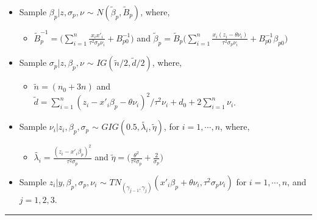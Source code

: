 \begin{itemize}
\tightlist
\item
  Sample \(\beta_{p}| z, \sigma_{p}, \nu\) \(\sim\) \(N(\tilde{\beta}_{p}, \tilde{B}_{p})\), where,

  \begin{itemize}
  \tightlist
  \item
    \(\tilde{B}^{-1}_{p} = \bigg(\sum_{i=1}^{n} \frac{x_{i}x'_{i}}{\tau^{2} \sigma_{p} \nu_{i}} + B_{p0}^{-1} \bigg)\) \hspace{0.05in} and \hspace{0.05in} \(\tilde{\beta}_{p} = \tilde{B}_{p}\bigg( \sum_{i=1}^{n} \frac{x_{i}(z_{i} - \theta\nu_{i})}{\tau^{2} \sigma_{p} \nu_{i}} + B_{p0}^{-1} \beta_{p0}\bigg)\)
  \end{itemize}
\item
  Sample \(\sigma_{p}| z, \beta_{p}, \nu\) \(\sim\) \(IG(\tilde{n}/2,\tilde{d}/2)\), where,

  \begin{itemize}
  \tightlist
  \item
    \(\tilde{n} = (n_{0} + 3n)\) \hspace{0.05in} and \hspace{0.05in} \(\tilde{d} = \sum_{i=1}^{n}(z_{i} - x'_{i}\beta_{p} - \theta\nu_{i})^{2}/\tau^{2}\nu_{i} + d_{0} + 2 \sum_{i=1}^{n} \nu_{i}\).
  \end{itemize}
\item
  Sample \(\nu_{i}| z_{i}, \beta_{p}, \sigma_{p}\) \(\sim\) \(GIG(0.5, \tilde{\lambda_{i}}, \tilde{\eta})\), for \(i=1,\cdots,n\), where,

  \begin{itemize}
  \tightlist
  \item
    \(\tilde{\lambda_{i}} = \frac{( z_{i} - x'_{i}\beta_{p})^2}{\tau^{2}\sigma_{p}}\) \hspace{0.05in} and \hspace{0.05in} \(\tilde{\eta} = \Big(\frac{\theta^2}{\tau^{2} \sigma_{p}} + \frac{2}{\sigma_{p}} \Big)\)
  \end{itemize}
\item
  Sample \(z_{i}|y, \beta_{p}, \sigma_{p}, \nu_{i}\) \(\sim\) \(TN_{(\gamma_{j-1}, \gamma_{j})}(x'_{i}\beta_{p} + \theta \nu_{i}, \tau^{2} \sigma_{p} \nu_{i})\) for \(i=1,\cdots,n\), and \(j=1,2,3\).
\end{itemize}

\noindent

\rule{\textwidth}{0.5pt}

